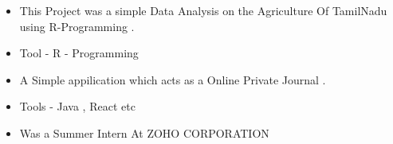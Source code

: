 \documentclass[10pt,a4paper,ragged2e]{altacv}
\begin{document}
\divider

\begin{itemize}
\item This Project was a simple Data Analysis on the Agriculture Of TamilNadu using R-Programming .  
\item Tool - R - Programming
\end{itemize}

\divider

\begin{itemize}
\item A Simple appilication which acts as a Online Private Journal .
\item Tools - Java , React etc
\end{itemize}

\divider


%


\begin{itemize}
\item Was a Summer Intern At ZOHO CORPORATION 
\end{itemize}


\end{document}
